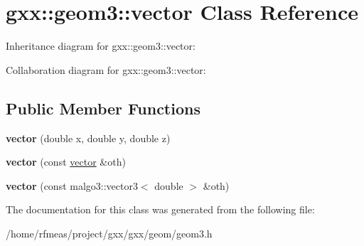 \hypertarget{classgxx_1_1geom3_1_1vector}{}\section{gxx\+:\+:geom3\+:\+:vector Class Reference}
\label{classgxx_1_1geom3_1_1vector}


Inheritance diagram for gxx\+:\+:geom3\+:\+:vector\+:


Collaboration diagram for gxx\+:\+:geom3\+:\+:vector\+:
\subsection*{Public Member Functions}
\begin{DoxyCompactItemize}
\item 
{\bfseries vector} (double x, double y, double z)\hypertarget{classgxx_1_1geom3_1_1vector_a130f4e610124fbdd9d62a078cdfabab4}{}\label{classgxx_1_1geom3_1_1vector_a130f4e610124fbdd9d62a078cdfabab4}

\item 
{\bfseries vector} (const \hyperlink{classgxx_1_1geom3_1_1vector}{vector} \&oth)\hypertarget{classgxx_1_1geom3_1_1vector_aa9e057b0e09682fd2b6950c021918a68}{}\label{classgxx_1_1geom3_1_1vector_aa9e057b0e09682fd2b6950c021918a68}

\item 
{\bfseries vector} (const malgo3\+::vector3$<$ double $>$ \&oth)\hypertarget{classgxx_1_1geom3_1_1vector_a1bb16669241163931f886395db6eaeb7}{}\label{classgxx_1_1geom3_1_1vector_a1bb16669241163931f886395db6eaeb7}

\end{DoxyCompactItemize}


The documentation for this class was generated from the following file\+:\begin{DoxyCompactItemize}
\item 
/home/rfmeas/project/gxx/gxx/geom/geom3.\+h\end{DoxyCompactItemize}
